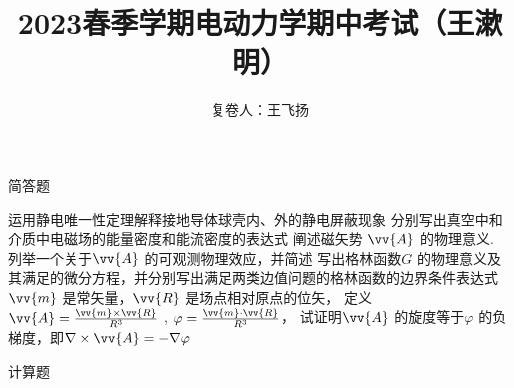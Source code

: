\documentclass{exam}
\author{复卷人：王飞扬}
\title{2023春季学期电动力学期中考试（王漱明）}
\begin{document}
\maketitle
\noindent
{\LARGE {\heiti 简答题}}
\begin{questions}
    \question 运用静电唯一性定理解释接地导体球壳内、外的静电屏蔽现象
    \question 分别写出真空中和介质中电磁场的能量密度和能流密度的表达式
    \question 阐述磁矢势 $\vv{A}$ 的物理意义. 列举一个关于$\vv{A}$ 的可观测物理效应，并简述
    \question 写出格林函数$G$ 的物理意义及其满足的微分方程，并分别写出满足两类边值问题的格林函数的边界条件表达式
    \question $\vv{m}$ 是常矢量，$\vv{R}$ 是场点相对原点的位矢，
    定义${ \vv{A}=\frac{\vv{m}\times\vv{R}}{R^3}}$ , ${ \varphi=\frac{\vv{m}\cdot\vv{R}}{R^3}}$，
    试证明$\vv{A}$ 的旋度等于$\varphi$ 的负梯度，即$\nabla\times\vv{A}=-\nabla\varphi$
\end{questions}
\noindent
{\LARGE {\heiti 计算题}}
\end{document}
